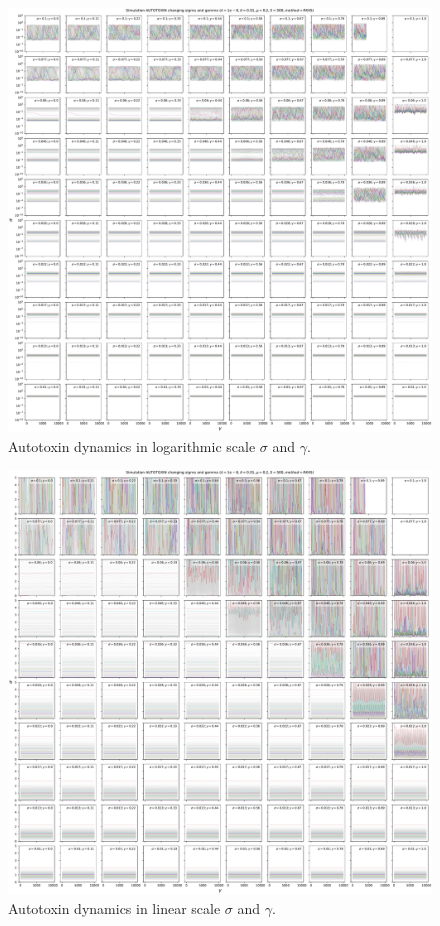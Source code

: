 \documentclass{article}
\begin{document}
\clearpage

\begin{figure}[H]
    \centering
    \includegraphics[width=\linewidth]{SigmaGamma/10Autotox.pdf}
    \caption{Autotoxin dynamics in logarithmic scale $\sigma$ and $\gamma$.}
\end{figure}

\clearpage

\begin{figure}[H]
    \centering
    \includegraphics[width=\linewidth]{SigmaGamma/10AutotoxLinear.pdf}
    \caption{Autotoxin dynamics in linear scale $\sigma$ and $\gamma$.}
\end{figure}
\end{document}
